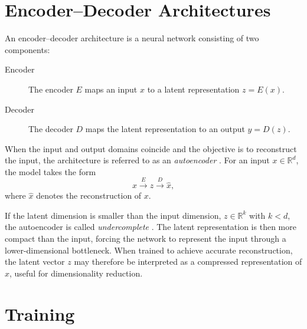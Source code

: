 \section{Encoder--Decoder Architectures}
\label{sec:encoder_decoder}

An encoder--decoder architecture is a neural network consisting of two components:

\begin{description}
    \item[Encoder]
    The encoder $E$ maps an input $x$ to a latent representation $z = E(x)$.

    \item[Decoder]
    The decoder $D$ maps the latent representation to an output $y = D(z)$.
\end{description}

When the input and output domains coincide and the objective is to reconstruct the input, the architecture is referred to as an \emph{autoencoder} \citep[Ch.~14]{Goodfellow2016}. For an input $x \in \mathbb{R}^d$, the model takes the form
\[
    x \xrightarrow{\;E\;} z \xrightarrow{\;D\;} \hat{x},
\]
where $\hat{x}$ denotes the reconstruction of $x$.

If the latent dimension is smaller than the input dimension, $z \in \mathbb{R}^k$ with $k < d$, the autoencoder is called \emph{undercomplete} \citep[Ch.~14]{Goodfellow2016}. The latent representation is then more compact than the input, forcing the network to represent the input through a lower-dimensional bottleneck. When trained to achieve accurate reconstruction, the latent vector $z$ may therefore be interpreted as a compressed representation of $x$, useful for dimensionality reduction. 





\section{Training}
\label{sec:training}

